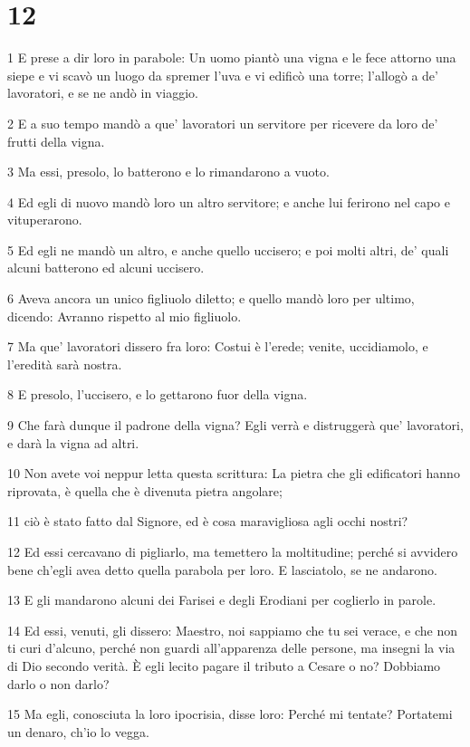 \chapter{12}

\par 1 E prese a dir loro in parabole: Un uomo piantò una vigna e le fece attorno una siepe e vi scavò un luogo da spremer l'uva e vi edificò una torre; l'allogò a de' lavoratori, e se ne andò in viaggio.
\par 2 E a suo tempo mandò a que' lavoratori un servitore per ricevere da loro de' frutti della vigna.
\par 3 Ma essi, presolo, lo batterono e lo rimandarono a vuoto.
\par 4 Ed egli di nuovo mandò loro un altro servitore; e anche lui ferirono nel capo e vituperarono.
\par 5 Ed egli ne mandò un altro, e anche quello uccisero; e poi molti altri, de' quali alcuni batterono ed alcuni uccisero.
\par 6 Aveva ancora un unico figliuolo diletto; e quello mandò loro per ultimo, dicendo: Avranno rispetto al mio figliuolo.
\par 7 Ma que' lavoratori dissero fra loro: Costui è l'erede; venite, uccidiamolo, e l'eredità sarà nostra.
\par 8 E presolo, l'uccisero, e lo gettarono fuor della vigna.
\par 9 Che farà dunque il padrone della vigna? Egli verrà e distruggerà que' lavoratori, e darà la vigna ad altri.
\par 10 Non avete voi neppur letta questa scrittura: La pietra che gli edificatori hanno riprovata, è quella che è divenuta pietra angolare;
\par 11 ciò è stato fatto dal Signore, ed è cosa maravigliosa agli occhi nostri?
\par 12 Ed essi cercavano di pigliarlo, ma temettero la moltitudine; perché si avvidero bene ch'egli avea detto quella parabola per loro. E lasciatolo, se ne andarono.
\par 13 E gli mandarono alcuni dei Farisei e degli Erodiani per coglierlo in parole.
\par 14 Ed essi, venuti, gli dissero: Maestro, noi sappiamo che tu sei verace, e che non ti curi d'alcuno, perché non guardi all'apparenza delle persone, ma insegni la via di Dio secondo verità. È egli lecito pagare il tributo a Cesare o no? Dobbiamo darlo o non darlo?
\par 15 Ma egli, conosciuta la loro ipocrisia, disse loro: Perché mi tentate? Portatemi un denaro, ch'io lo vegga.
